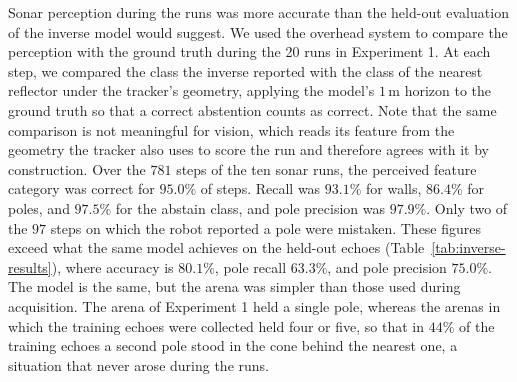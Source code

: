 \documentclass[11pt]{article}
\begin{document}
Sonar perception during the runs was more accurate than the held-out evaluation of the inverse model would suggest. We used the overhead system to compare the perception with the ground truth during the 20 runs in Experiment 1. At each step, we compared the class the inverse reported with the class of the nearest reflector under the tracker's geometry, applying the model's $1$\,m horizon to the ground truth so that a correct abstention counts as correct. Note that the same comparison is not meaningful for vision, which reads its feature from the geometry the tracker also uses to score the run and therefore agrees with it by construction. Over the $781$ steps of the ten sonar runs, the perceived feature category was correct for $95.0\%$ of steps. Recall was $93.1\%$ for walls, $86.4\%$ for poles, and $97.5\%$ for the abstain class, and pole precision was $97.9\%$. Only two of the $97$ steps on which the robot reported a pole were mistaken. These figures exceed what the same model achieves on the held-out echoes (Table~\ref{tab:inverse-results}), where accuracy is $80.1\%$, pole recall $63.3\%$, and pole precision $75.0\%$. The model is the same, but the arena was simpler than those used during acquisition. The arena of Experiment 1 held a single pole, whereas the arenas in which the training echoes were collected held four or five, so that in $44\%$ of the training echoes a second pole stood in the cone behind the nearest one, a situation that never arose during the runs. 




\end{document}
